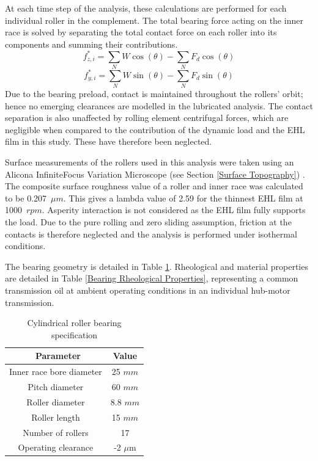 At each time step of the analysis, these calculations are performed for each individual roller in the complement. The total bearing force acting on the inner race is solved by separating the total contact force on each roller into its components and summing their contributions.
\begin{equation}\label{Total bearing force z flexitribo}
	f_{z, i}^*=\sum_N W \cos (\theta)-\sum_N F_d \cos (\theta)
\end{equation}
\begin{equation}\label{Total bearing force y flexitribo}
	f_{y, i}^*=\sum_N W \sin (\theta)-\sum_N F_d \sin (\theta)
\end{equation}
Due to the bearing preload, contact is maintained throughout the rollers’ orbit; hence no emerging clearances are modelled in the lubricated analysis. The contact separation is also unaffected by rolling element centrifugal forces, which are negligible when compared to the contribution of the dynamic load and the EHL film in this study. These have therefore been neglected.

Surface measurements of the rollers used in this analysis were taken using an Alicona InfiniteFocus Variation Microscope (see Section \ref{Surface Topography}) . The composite surface roughness value of a roller and inner race was calculated to be 0.207~$\mu m$. This gives a lambda value of 2.59 for the thinnest EHL film at 1000~$rpm$. Asperity interaction is not considered as the EHL film fully supports the load. Due to the pure rolling and zero sliding assumption, friction at the contacts is therefore neglected and the analysis is performed under isothermal conditions.

The bearing geometry is detailed in Table \ref{Cylindrical Roller Bearing Specification}. Rheological and material properties are detailed in Table \ref{Bearing Rheological Properties}, representing a common transmission oil at ambient operating conditions in an individual hub-motor transmission.

\begin{table}
	\caption{Cylindrical roller bearing specification}
	\label{Cylindrical Roller Bearing Specification}
	\centering
	\renewcommand{\arraystretch}{1.5}%
	\begin{tabular}{|c|c|}
		\hline
		\ \textbf{Parameter} & \textbf{Value} \\ [0.5ex]
		\hline
		Inner race bore diameter & 25 $mm$ \\ [0.5ex]
		\hline
		Pitch diameter & 60 $mm$ \\ [0.5ex]
		\hline
		Roller diameter & 8.8 $mm$ \\ [0.5ex]
		\hline
	    Roller length & 15 $mm$ \\ [0.5ex]
		\hline
	    Number of rollers & 17 \\ [0.5ex]
		\hline
		Operating clearance & -2 $\mu \mathrm{m}$ \\ [0.5ex]
		\hline
	\end{tabular}
\end{table}

